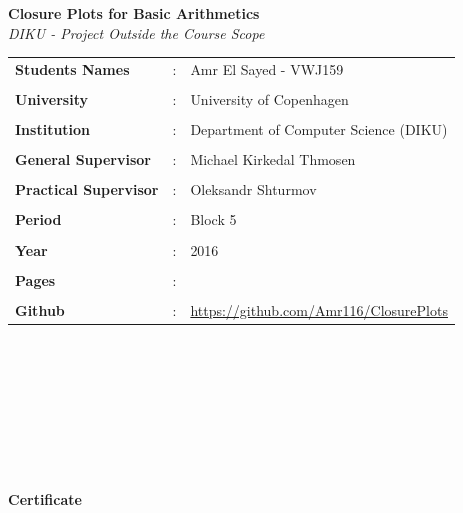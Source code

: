 \documentclass[11pt]{article}
\begin{document}
\clearpage\maketitle
\thispagestyle{empty}
\newpage
\begin{center}{\huge\textbf{Closure Plots for Basic Arithmetics}}\newline \textit{\\DIKU - Project Outside the Course Scope}\end{center}
\hfill \break
\begin{tabular}{l l l }
\textbf{Students Names} &: &Amr El Sayed - VWJ159\\\\
\textbf{University} &:& University of Copenhagen\\\\
\textbf{Institution} &:& Department of Computer Science (DIKU)\\\\
\textbf{General Supervisor} &:& Michael Kirkedal Thmosen\\\\
\textbf{Practical Supervisor} &:& Oleksandr Shturmov\\\\
\textbf{Period} &:& Block 5\\\\
\textbf{Year} &:& 2016\\\\
\textbf{Pages} &:& \\\\
\textbf{Github} &:& \url{https://github.com/Amr116/ClosurePlots}\\
\end{tabular}
\\\\\\\\\\\\\\
\begin{center}{\huge\textbf{Certificate}}\end{center}
\end{document}
